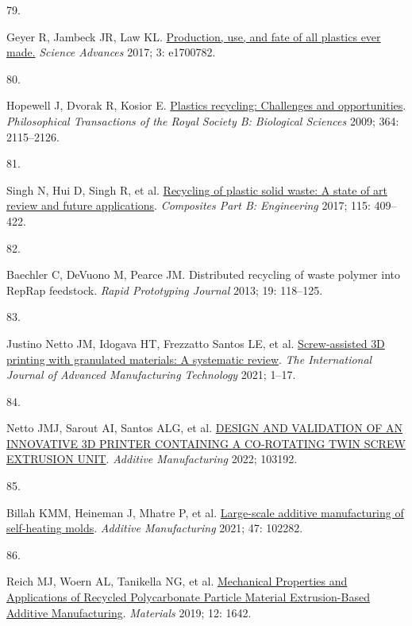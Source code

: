 \documentclass[
  11pt,
  a4paperpaper,
  onecolumn]{article}
\newlength{\cslhangindent}
\newlength{\csllabelwidth}
\newlength{\cslentryspacingunit} %
\newenvironment{CSLReferences}[2] %
 {%
  \setlength{\parindent}{0pt}
  \ifodd #1
  \let\oldpar\par
  \def\par{\hangindent=\cslhangindent\oldpar}
  \fi
  \setlength{\parskip}{#2\cslentryspacingunit}
 }%
 {}
\newcommand{\CSLLeftMargin}[1]{\parbox[t]{\csllabelwidth}{#1}}
\newcommand{\CSLRightInline}[1]{\parbox[t]{\linewidth - \csllabelwidth}{#1}\break}
\begin{document}
\begin{CSLReferences}{0}{0}
\leavevmode{}%
\CSLLeftMargin{79. }%
\CSLRightInline{Geyer R, Jambeck JR, Law KL.
\href{https://doi.org/10.1126/sciadv.1700782}{Production, use, and fate
of all plastics ever made.} \emph{Science Advances} 2017; 3: e1700782.}

\leavevmode{}%
\CSLLeftMargin{80. }%
\CSLRightInline{Hopewell J, Dvorak R, Kosior E.
\href{https://doi.org/10.1098/rstb.2008.0311}{Plastics recycling:
Challenges and opportunities}. \emph{Philosophical Transactions of the
Royal Society B: Biological Sciences} 2009; 364: 2115--2126.}

\leavevmode{}%
\CSLLeftMargin{81. }%
\CSLRightInline{Singh N, Hui D, Singh R, et al.
\href{https://doi.org/10.1016/j.compositesb.2016.09.013}{Recycling of
plastic solid waste: {A} state of art review and future applications}.
\emph{Composites Part B: Engineering} 2017; 115: 409--422.}

\leavevmode{}%
\CSLLeftMargin{82. }%
\CSLRightInline{Baechler C, DeVuono M, Pearce JM. {Distributed recycling
of waste polymer into RepRap feedstock}. \emph{Rapid Prototyping
Journal} 2013; 19: 118--125.}

\leavevmode{}%
\CSLLeftMargin{83. }%
\CSLRightInline{Justino Netto JM, Idogava HT, Frezzatto Santos LE, et
al. \href{https://doi.org/10.1007/s00170-021-07365-z}{Screw-assisted
{3D} printing with granulated materials: A systematic review}. \emph{The
International Journal of Advanced Manufacturing Technology} 2021;
1--17.}

\leavevmode{}%
\CSLLeftMargin{84. }%
\CSLRightInline{Netto JMJ, Sarout AI, Santos ALG, et al.
\href{https://doi.org/10.1016/j.addma.2022.103192}{{DESIGN AND
VALIDATION OF AN INNOVATIVE 3D PRINTER CONTAINING A CO-ROTATING TWIN
SCREW EXTRUSION UNIT}}. \emph{Additive Manufacturing} 2022; 103192.}

\leavevmode{}%
\CSLLeftMargin{85. }%
\CSLRightInline{Billah KMM, Heineman J, Mhatre P, et al.
\href{https://doi.org/10.1016/J.ADDMA.2021.102282}{Large-scale additive
manufacturing of self-heating molds}. \emph{Additive Manufacturing}
2021; 47: 102282.}

\leavevmode{}%
\CSLLeftMargin{86. }%
\CSLRightInline{Reich MJ, Woern AL, Tanikella NG, et al.
\href{https://doi.org/10.3390/ma12101642}{Mechanical {Properties} and
{Applications} of {Recycled Polycarbonate Particle Material
Extrusion-Based Additive Manufacturing}}. \emph{Materials} 2019; 12:
1642.}


\end{CSLReferences}
\end{document}
